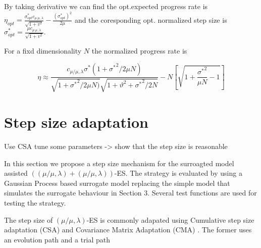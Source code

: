 By taking derivative we can find the opt.expected progress rate is $\eta_{opt} = \frac{\sigma^*_{opt} c_{\mu \ \mu, \lambda}}{\sqrt {1+ v^2}} - \frac{(\sigma^*_{opt})^2}{2 \mu}$ and the coresponding opt. normalized step size is $\sigma^*_{opt} = \frac{ \mu c_{\mu \ \mu, \lambda}}{\sqrt {1+ v^2}} $.


For a fixd dimensionality $N$ the normalized progress rate \cite{ARNOLD2002629} is 


$$
\eta \approx \frac{c_{\mu/\mu,\lambda} \sigma^* (1+{\sigma^*}^2 /2\mu N)}{\sqrt{ 1+{\sigma^*}^2 /2\mu N) } \sqrt{ 1+ \vartheta^2 +{\sigma^*}^2 /2N }} - N \left [ \sqrt{1+ \frac{ {\sigma^*}^2 }{\mu N} - 1} \right ] 
$$

\section{Step size adaptation}


Use CSA tune some parameters -> show that the step size is reasonable

In this section we propose a step size mechanism for the surroagted model assisted $((\mu/\mu,\lambda)+(\mu/\mu,\lambda))$-ES.  The strategy is evaluated by using a Gaussian Process based surrogate model replacing the simple model that simulates the surrogate behaviour in Section 3. Several test functions are used for testing the strategy.

The step size of $(\mu/\mu,\lambda)$-ES is commonly adapated using Cumulative step size adaptation (CSA) \cite{Ostermeier:1994:DAS:1326675.1326679} and Covariance Matrix Adaptation (CMA) \cite{Hansen:2003:RTC:772374.772376}. The former uses an evolution path and a trial path 




